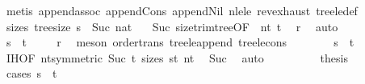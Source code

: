 \begin{isabellebody}
\ {\isacharparenleft}{\kern0pt}metis\ append{\isachardot}{\kern0pt}assoc\ append{\isacharunderscore}{\kern0pt}Cons\ append{\isacharunderscore}{\kern0pt}Nil\ nle{\isacharunderscore}{\kern0pt}le\ rev{\isacharunderscore}{\kern0pt}exhaust\ tree{\isacharunderscore}{\kern0pt}le{\isacharunderscore}{\kern0pt}def{\isacharparenright}{\kern0pt}\isanewline
\ \ \ \ \ \ \isamarkupfalse%
\ size{\isacharunderscore}{\kern0pt}s{\isacharcolon}{\kern0pt}\ {\isachardoublequoteopen}tree{\isacharunderscore}{\kern0pt}size\ s\ {\isasymle}\ Suc\ nat{\isachardoublequoteclose}\ \isamarkupfalse%
\ {}{\isacharparenleft}{\kern0pt}{}{\isacharparenright}{\kern0pt}\ Suc\ size{\isacharunderscore}{\kern0pt}trim{\isacharunderscore}{\kern0pt}tree{\isacharbrackleft}{\kern0pt}OF\ {\isacharunderscore}{\kern0pt}\ nt{}{\isacharbrackright}{\kern0pt}\ t{}\ \isamarkupfalse%
\ r\ \isamarkupfalse%
\ auto\isanewline
\ \ \ \ \ \ \isamarkupfalse%
\ {\isachardoublequoteopen}s\ {\isasymle}\ t{\isachardoublequoteclose}\ \isamarkupfalse%
\ {}{\isacharparenleft}{\kern0pt}{}{\isacharparenright}{\kern0pt}\ \isamarkupfalse%
\ r\ \isamarkupfalse%
\ {\isacharparenleft}{\kern0pt}meson\ order{\isachardot}{\kern0pt}trans\ tree{\isacharunderscore}{\kern0pt}le{\isacharunderscore}{\kern0pt}append\ tree{\isacharunderscore}{\kern0pt}le{\isacharunderscore}{\kern0pt}cons{}{\isacharparenright}{\kern0pt}\isanewline
\ \ \ \ \ \ \isamarkupfalse%
\ {\isachardoublequoteopen}s\ {\isasymle}\ t{}{\isachardoublequoteclose}\ \isamarkupfalse%
\ {\isachardoublequoteopen}{}{\isachardot}{\kern0pt}IH{\isachardoublequoteclose}{\isacharparenleft}{\kern0pt}{}{\isacharparenright}{\kern0pt}{\isacharbrackleft}{\kern0pt}OF\ nt{}{\isacharbrackleft}{\kern0pt}symmetric{\isacharbrackright}{\kern0pt}\ Suc\ t{}\ size{\isacharunderscore}{\kern0pt}s\ {\isacartoucheopen}s{\isasymle}t{\isacartoucheclose}{\isacharbrackright}{\kern0pt}\ nt{}\ \isamarkupfalse%
\ Suc\ \isamarkupfalse%
\ auto\isanewline
\ \ \ \ \ \ \isamarkupfalse%
\ \isamarkupfalse%
\ {\isacharquery}{\kern0pt}thesis\isanewline
\ \ \ \ \ \ \isamarkupfalse%
\ {\isacharparenleft}{\kern0pt}cases\ {\isachardoublequoteopen}s\ {\isacharequal}{\kern0pt}\ t{}{\isachardoublequoteclose}{\isacharparenright}{\kern0pt}\isanewline

\end{isabellebody}
